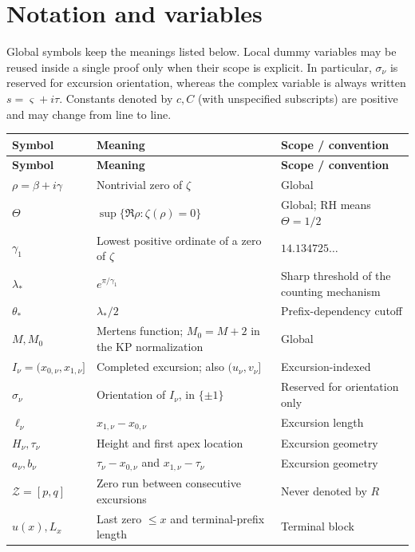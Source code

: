 \documentclass[11pt]{amsart}
\numberwithin{equation}{section}
\theoremstyle{plain}
\theoremstyle{definition}
\theoremstyle{remark}
\begin{document}
\section{Notation and variables}
\label{sec:notation}

Global symbols keep the meanings listed below.  Local dummy variables may be
reused inside a single proof only when their scope is explicit.  In
particular, $\sigma_\nu$ is reserved for excursion orientation, whereas the
complex variable is always written $s=\varsigma+i\tau$.  Constants denoted
by $c,C$ (with unspecified subscripts) are positive and may change from line
to line.

\small
\setlength{\LTpre}{4pt}
\setlength{\LTpost}{8pt}
\begin{longtable}{@{}p{}p{}p{}@{}}
\toprule
\textbf{Symbol} & \textbf{Meaning} & \textbf{Scope / convention}\\
\midrule
\endfirsthead
\toprule
\textbf{Symbol} & \textbf{Meaning} & \textbf{Scope / convention}\\
\midrule
\endhead
$\rho=\beta+i\gamma$ & Nontrivial zero of $\zeta$ & Global\\
$\Theta$ & $\sup\{\Re\rho:\zeta(\rho)=0\}$ & Global; RH means $\Theta=1/2$\\
$\gamma_1$ & Lowest positive ordinate of a zero of $\zeta$ & $14.134725\ldots$\\
$\lambda_*$ & $e^{\pi/\gamma_1}$ & Sharp threshold of the counting mechanism\\
$\theta_*$ & $\lambda_*/2$ & Prefix-dependency cutoff\\
$M,M_0$ & Mertens function; $M_0=M+2$ in the KP normalization & Global\\
$I_\nu=(x_{0,\nu},x_{1,\nu}]$ & Completed excursion; also $(u_\nu,v_\nu]$ & Excursion-indexed\\
$\sigma_\nu$ & Orientation of $I_\nu$, in $\{\pm1\}$ & Reserved for orientation only\\
$\ell_\nu$ & $x_{1,\nu}-x_{0,\nu}$ & Excursion length\\
$H_\nu,\tau_\nu$ & Height and first apex location & Excursion geometry\\
$a_\nu,b_\nu$ & $\tau_\nu-x_{0,\nu}$ and $x_{1,\nu}-\tau_\nu$ & Excursion geometry\\
$\mathcal Z=[p,q]$ & Zero run between consecutive excursions & Never denoted by $R$\\
$u(x),L_x$ & Last zero $\le x$ and terminal-prefix length & Terminal block\\

\end{longtable}
\end{document}
